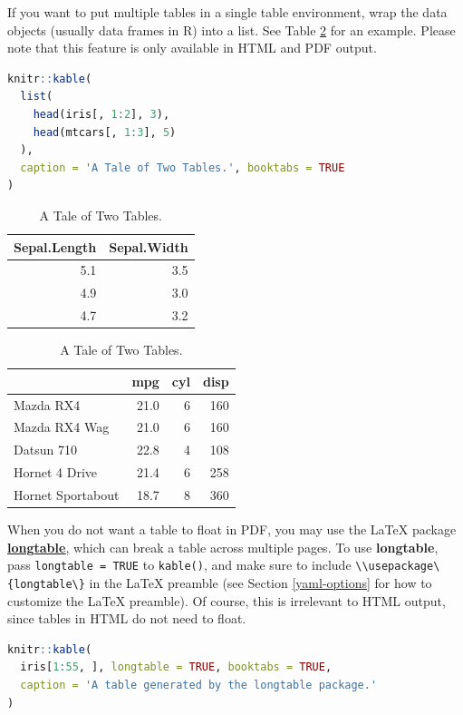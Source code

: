 \documentclass[doctor,openright,twoside]{sjtuthesis}
\newcommand{\passthrough}[1]{#1}
\theoremstyle{plain}
\theoremstyle{definition}
\theoremstyle{remark}
\theoremstyle{ocrenumbox}
\theoremstyle{plain}
\begin{document}
If you want to put multiple tables in a single table environment, wrap the data objects (usually data frames in R) into a list. See Table \ref{tab:table-multi} for an example. Please note that this feature is only available in HTML and PDF output.

\begin{lstlisting}[language=R]
knitr::kable(
  list(
    head(iris[, 1:2], 3),
    head(mtcars[, 1:3], 5)
  ),
  caption = 'A Tale of Two Tables.', booktabs = TRUE
)
\end{lstlisting}

\begin{table}
\caption{\label{tab:table-multi}A Tale of Two Tables.}

\centering
\begin{tabular}{rr}
\toprule
Sepal.Length & Sepal.Width\\
\midrule
5.1 & 3.5\\
4.9 & 3.0\\
4.7 & 3.2\\
\bottomrule
\end{tabular}
\centering
\begin{tabular}{lrrr}
\toprule
  & mpg & cyl & disp\\
\midrule
Mazda RX4 & 21.0 & 6 & 160\\
Mazda RX4 Wag & 21.0 & 6 & 160\\
Datsun 710 & 22.8 & 4 & 108\\
Hornet 4 Drive & 21.4 & 6 & 258\\
Hornet Sportabout & 18.7 & 8 & 360\\
\bottomrule
\end{tabular}
\end{table}

When you do not want a table to float in PDF, you may use the LaTeX package \href{https://www.ctan.org/pkg/longtable}{\textbf{longtable},} which can break a table across multiple pages. To use \textbf{longtable}, pass \passthrough{\lstinline!longtable = TRUE!} to \passthrough{\lstinline!kable()!}, and make sure to include \passthrough{\lstinline!\\usepackage\{longtable\}!} in the LaTeX preamble (see Section \ref{yaml-options} for how to customize the LaTeX preamble). Of course, this is irrelevant to HTML output, since tables in HTML do not need to float.

\begin{lstlisting}[language=R]
knitr::kable(
  iris[1:55, ], longtable = TRUE, booktabs = TRUE,
  caption = 'A table generated by the longtable package.'
)
\end{lstlisting}
\end{document}
